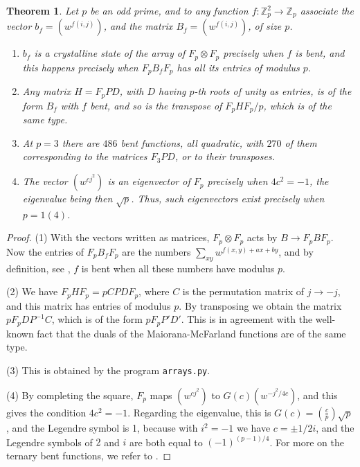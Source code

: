 \documentclass[11pt]{amsart}
\newtheorem{theorem}{Theorem}[section]
\theoremstyle{definition}
\begin{document}
\begin{theorem}
Let $p$ be an odd prime, and to any function $f:\mathbb Z_p^2\to\mathbb Z_p$ associate the vector $b_f=(w^{f(i,j)})$, and the matrix $B_f=(w^{f(i,j)})$, of size $p$.
\begin{enumerate}
\item $b_f$ is a crystalline state of the array of $F_p\otimes F_p$ precisely when $f$ is bent, and this happens precisely when $F_pB_fF_p$ has all its entries of modulus $p$.

\item Any matrix $H=F_pPD$, with $D$ having $p$-th roots of unity as entries, is of the form $B_f$ with $f$ bent, and so is the transpose of $F_pHF_p/p$, which is of the same type.

\item At $p=3$ there are $486$ bent functions, all quadratic, with $270$ of them corresponding to the matrices $F_3PD$, or to their transposes.

\item The vector $(w^{cj^2})$ is an eigenvector of $F_p$ precisely when $4c^2=-1$, the eigenvalue being then $\sqrt{p}$. Thus, such eigenvectors exist precisely when $p=1(4)$.
\end{enumerate}
\end{theorem}

\begin{proof}
(1) With the vectors written as matrices, $F_p\otimes F_p$ acts by $B\to F_pBF_p$. Now the entries of $F_pB_fF_p$ are the numbers $\sum_{xy}w^{f(x,y)+ax+by}$, and by definition, see \cite{ksw}, $f$ is bent when all these numbers have modulus $p$.

\medskip

(2) We have $F_pHF_p=pCPDF_p$, where $C$ is the permutation matrix of $j\to-j$, and this matrix has entries of modulus $p$. By transposing we obtain the matrix $pF_pDP^{-1}C$, which is of the form $pF_pP'D'$. This is in agreement with the well-known fact that the duals of the Maiorana-McFarland functions are of the same type.

\medskip

(3) This is obtained by the program \texttt{arrays.py}.

\medskip

(4) By completing the square, $F_p$ maps $(w^{cj^2})$ to $G(c)(w^{-j^2/4c})$, and this gives the condition $4c^2=-1$. Regarding the eigenvalue, this is $G(c)=\left(\frac{c}{p}\right)\sqrt{p}$, and the Legendre symbol is 1, because with $i^2=-1$ we have $c=\pm1/2i$, and the Legendre symbols of $2$ and $i$ are both equal to $(-1)^{(p-1)/4}$.
For more on the ternary bent functions, we refer to \cite{mss}.
\end{proof}
\end{document}
